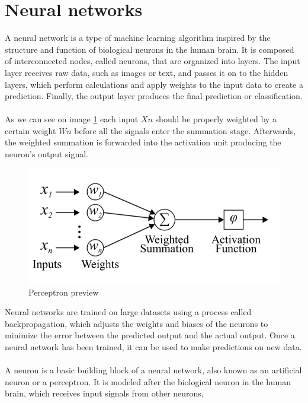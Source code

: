 \section{Neural networks} \label{sec:nn}
A neural network is a type of machine learning algorithm inspired by the structure and function of biological neurons
in the human brain. It is composed of interconnected nodes, called neurons, that are organized into layers. The input
layer receives raw data, such as images or text, and passes it on to the hidden layers, which perform calculations and
apply weights to the input data to create a prediction. Finally, the output layer produces the final prediction
or classification.\\
\\
As we can see on image \ref{fig:perceptron} each input $Xn$ should be properly weighted by a certain weight $Wn$ before
all the signals enter the summation stage. Afterwards, the weighted summation is forwarded into the activation unit
producing the neuron’s output signal.
\begin{center}
    \begin{figure}[!ht]
        \centering
        \includegraphics[width=1\textwidth]{figures/nn}
        \caption{Perceptron preview \cite{Mourgias-Alexandris:19}}
        \label{fig:perceptron}
    \end{figure}
\end{center}
Neural networks are trained on large datasets using a process called backpropagation, which adjusts the weights and
biases of the neurons to minimize the error between the predicted output and the actual output. Once a neural network
has been trained, it can be used to make predictions on new data.\\
\\
A neuron is a basic building block of a neural network, also known as an artificial neuron or a perceptron.
It is modeled after the biological neuron in the human brain, which receives input signals from other neurons,
